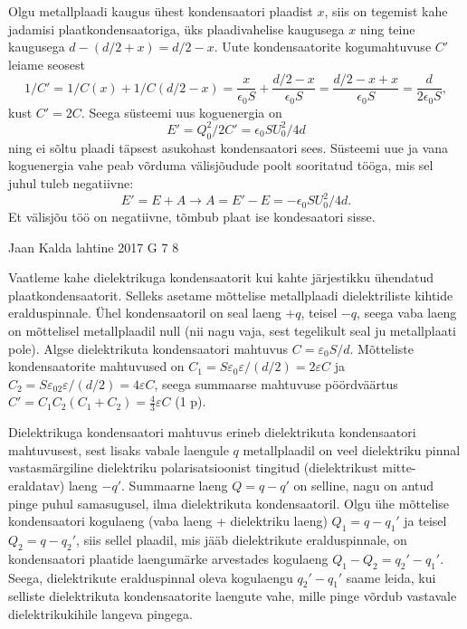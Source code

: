 \documentclass[11pt, twoside]{article}
\begin{document}
{{Olgu metallplaadi kaugus ühest kondensaatori plaadist $x$, siis on tegemist kahe jadamisi plaatkondensaatoriga, üks plaadivahelise kaugusega $x$ ning teine kaugusega $d - (d/2 + x) = d/2 - x$. Uute kondensaatorite kogumahtuvuse $C'$ leiame seosest $$1/C' = 1/C(x) + 1/C(d/2-x) = \frac{x}{\epsilon_0 S} + \frac{d/2 - x}{\epsilon_0 S} = \frac{d/2 - x + x}{\epsilon_0 S} = \frac{d}{2 \epsilon_0 S},$$kust $C' = 2C$. Seega süsteemi uus koguenergia on $$E' = Q_0^2 / 2C' = \epsilon_0 S U_0^2/ 4 d$$ ning ei sõltu plaadi täpsest asukohast kondensaatori sees. Süsteemi uue ja vana koguenergia vahe peab võrduma välisjõudude poolt sooritatud tööga, mis sel juhul tuleb negatiivne:
$$E' = E + A \rightarrow A = E' - E = - \epsilon_0 S U_0^2/ 4 d.$$
Et välisjõu töö on negatiivne, tõmbub plaat ise kondesaatori sisse.
\fi
}

{Jaan Kalda} %
{lahtine} %
{2017} %
{G 7} %
{8} %
{

\ifSolution
Vaatleme kahe dielektrikuga kondensaatorit kui kahte järjestikku ühendatud plaatkondensaatorit. Selleks asetame mõttelise metallplaadi dielektriliste kihtide eralduspinnale. Ühel kondensaatoril on seal laeng $+q$, teisel $-q$, seega vaba laeng on mõttelisel metallplaadil null (nii nagu vaja, sest tegelikult seal ju metallplaati pole). Algse dielektrikuta kondensaatori mahtuvus $C=\varepsilon_0S/d$. Mõtteliste kondensaatorite mahtuvused on $C_1=S\varepsilon_0\varepsilon/(d/2)=2\varepsilon C$ ja $C_2=S\varepsilon_02\varepsilon/(d/2)=4\varepsilon C$, seega summaarse mahtuvuse pöördväärtus $C'=C_1C_2(C_1+C_2)=\frac 43\varepsilon C$ (1 p).

Dielektrikuga kondensaatori mahtuvus erineb dielektrikuta kondensaatori mahtuvusest, sest lisaks vabale laengule $q$ metallplaadil on veel dielektriku pinnal vastasmärgiline dielektriku polarisatsioonist tingitud (dielektrikust mitte-eraldatav) laeng $-q'$. Summaarne laeng $Q=q-q'$ on selline, nagu on antud pinge puhul samasugusel, ilma dielektrikuta kondensaatoril. Olgu ühe mõttelise kondensaatori kogulaeng (vaba laeng + dielektriku laeng) $Q_1=q-q_1'$ ja teisel $Q_2=q-q_2'$, siis sellel plaadil, mis jääb dielektrikute eralduspinnale, on kondensaatori plaatide laengumärke arvestades kogulaeng $Q_1-Q_2=q_2'-q_1'$. Seega, dielektrikute eralduspinnal oleva kogulaengu $q_2'-q_1'$ saame leida, kui selliste dielektrikuta kondensaatorite laengute vahe, mille pinge võrdub vastavale dielektrikukihile langeva pingega. 

}}
\end{document}
